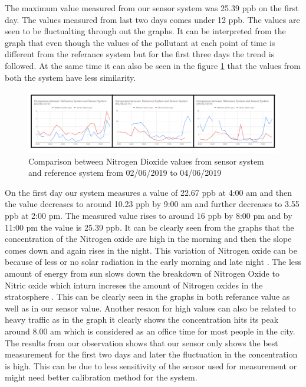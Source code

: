  \bigskip

The maximum value measured from our sensor system was 25.39 ppb on the first day. The values measured from last two days comes under 12 ppb. The values are seen to be fluctualting through out the graphs. It can be interpreted from the graph that even though the values of the pollutant at each point of time is different from the referance system but for the first three days the trend is followed. At the same time it can also be seen in the figure \ref{Nitrogen1} that the values from both the system have less similarity.

    \begin{figure}[h]
      \begin{center}
      \includegraphics[scale=0.70]{images/figure24.png}
      \end{center}
      \caption{Comparison between Nitrogen Dioxide values from sensor system and reference system from 02/06/2019 to 04/06/2019}
      \label{Nitrogen1}
    \end{figure}

    On the first day our system measures a value of 22.67 ppb at 4:00 am and then the value decreases to around 10.23 ppb by 9:00 am and further decreases to 3.55 ppb at 2:00 pm. The measured value rises to around 16 ppb by 8:00 pm and by 11:00 pm the value is 25.39 ppb. It can be clearly seen from the graphs that the concentration of the Nitrogen oxide are high in the morning and then the slope comes down and again rises in the night. This variation of Nitrogen oxide can be because of less or no  solar radiation in the early morning and late night \cite{Environment2010} \cite{George2005}. The less amount of energy from sun slows down the breakdown of Nitrogen Oxide to Nitric oxide which inturn increses the amount of Nitrogen oxides in the stratosphere \cite{EnvironmentalQualitySectionMoE2012} \cite{Environment2010}. This can be clearly seen in the graphs in both referance value as well as in our sensor value. Another resaon for high values can also be related to heavy traffic as in the graph it clearly shows the concentration hits its peak around 8.00 am which is considered as an office time for most people in the city. The results from our observation shows that our sensor only shows the best measurement for the first two days and later the fluctuation in the concentration is high. This can be due to less sensitivity of the sensor used for measurement or might need better calibration method for the system.



